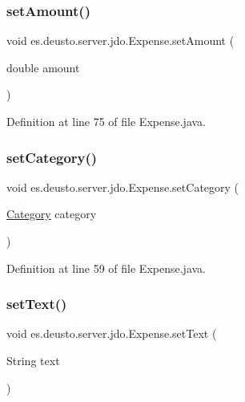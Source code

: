 \subsubsection{\texorpdfstring{set\+Amount()}{setAmount()}}
{\footnotesize\ttfamily void es.\+deusto.\+server.\+jdo.\+Expense.\+set\+Amount (\begin{DoxyParamCaption}\item[{double}]{amount }\end{DoxyParamCaption})}



Definition at line 75 of file Expense.\+java.

\mbox{\label{classes_1_1deusto_1_1server_1_1jdo_1_1_expense_aff380f7cb2ae1691daaef89fbd547974}} 
\subsubsection{\texorpdfstring{set\+Category()}{setCategory()}}
{\footnotesize\ttfamily void es.\+deusto.\+server.\+jdo.\+Expense.\+set\+Category (\begin{DoxyParamCaption}\item[{\hyperlink{enumes_1_1deusto_1_1server_1_1jdo_1_1_category}{Category}}]{category }\end{DoxyParamCaption})}



Definition at line 59 of file Expense.\+java.

\mbox{\label{classes_1_1deusto_1_1server_1_1jdo_1_1_expense_aff1a35b5f6a893ddfafaa2eda21534d2}} 
\subsubsection{\texorpdfstring{set\+Text()}{setText()}}
{\footnotesize\ttfamily void es.\+deusto.\+server.\+jdo.\+Expense.\+set\+Text (\begin{DoxyParamCaption}\item[{String}]{text }\end{DoxyParamCaption})}



